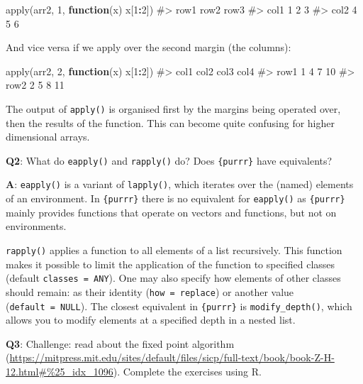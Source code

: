 \documentclass[
]{krantz}
\makeatletter
\newenvironment{Shaded}{\begin{snugshade}}{\end{snugshade}}
\newcommand{\CommentTok}[1]{\textcolor[rgb]{0.56,0.35,0.01}{\textit{#1}}}
\newcommand{\ControlFlowTok}[1]{\textcolor[rgb]{0.13,0.29,0.53}{\textbf{#1}}}
\newcommand{\DecValTok}[1]{\textcolor[rgb]{0.00,0.00,0.81}{#1}}
\newcommand{\KeywordTok}[1]{\textcolor[rgb]{0.13,0.29,0.53}{\textbf{#1}}}
\newcommand{\NormalTok}[1]{#1}
\newcommand{\OperatorTok}[1]{\textcolor[rgb]{0.81,0.36,0.00}{\textbf{#1}}}
\renewcommand{\href}[2]{#2 (\url{#1})}
\newenvironment{kframe}{%
\medskip{}
\setlength{\fboxsep}{.8em}
 \def\at@end@of@kframe{}%
 \ifinner\ifhmode%
  \def\at@end@of@kframe{\end{minipage}}%
  \begin{minipage}{\columnwidth}%
 \fi\fi%
 \def\FrameCommand##1{\hskip\@totalleftmargin \hskip-\fboxsep
 \colorbox{shadecolor}{##1}\hskip-\fboxsep
     \hskip-\linewidth \hskip-\@totalleftmargin \hskip\columnwidth}%
 \MakeFramed {\advance\hsize-\width
   \@totalleftmargin\z@ \linewidth\hsize
   \@setminipage}}%
 {\par\unskip\endMakeFramed%
 \at@end@of@kframe}
\renewenvironment{Shaded}{\begin{kframe}}{\end{kframe}}
\renewcommand{\KeywordTok} [1]{\textcolor[rgb]{0.00,0.44,0.13}{{#1}}}
\renewcommand{\DecValTok}  [1]{\textcolor[rgb]{0.25,0.63,0.44}{{#1}}}
\renewcommand{\CommentTok} [1]{\textcolor[rgb]{0.38,0.63,0.69}{{#1}}}
\renewcommand{\NormalTok}  [1]{{#1}}
\makeatother
\begin{document}
\begin{Shaded}
\begin{Highlighting}[]
\KeywordTok{apply}\NormalTok{(arr2, }\DecValTok{1}\NormalTok{, }\ControlFlowTok{function}\NormalTok{(x) x[}\DecValTok{1}\OperatorTok{:}\DecValTok{2}\NormalTok{])}
\CommentTok{#>      row1 row2 row3}
\CommentTok{#> col1    1    2    3}
\CommentTok{#> col2    4    5    6}
\end{Highlighting}
\end{Shaded}

And vice versa if we apply over the second margin (the columns):

\begin{Shaded}
\begin{Highlighting}[]
\KeywordTok{apply}\NormalTok{(arr2, }\DecValTok{2}\NormalTok{, }\ControlFlowTok{function}\NormalTok{(x) x[}\DecValTok{1}\OperatorTok{:}\DecValTok{2}\NormalTok{])}
\CommentTok{#>      col1 col2 col3 col4}
\CommentTok{#> row1    1    4    7   10}
\CommentTok{#> row2    2    5    8   11}
\end{Highlighting}
\end{Shaded}

The output of \texttt{apply()} is organised first by the margins being operated over, then the results of the function. This can become quite confusing for higher dimensional arrays.

\textbf{{Q2}}: What do \texttt{eapply()} and \texttt{rapply()} do? Does \texttt{\{purrr\}} have equivalents?

\textbf{{A}}: \texttt{eapply()} is a variant of \texttt{lapply()}, which iterates over the (named) elements of an environment. In \texttt{\{purrr\}} there is no equivalent for \texttt{eapply()} as \texttt{\{purrr\}} mainly provides functions that operate on vectors and functions, but not on environments.

\texttt{rapply()} applies a function to all elements of a list recursively. This function makes it possible to limit the application of the function to specified classes (default \texttt{classes\ =\ ANY}). One may also specify how elements of other classes should remain: as their identity (\texttt{how\ =\ replace}) or another value (\texttt{default\ =\ NULL}). The closest equivalent in \texttt{\{purrr\}} is \texttt{modify\_depth()}, which allows you to modify elements at a specified depth in a nested list.

\textbf{{Q3}}: Challenge: read about the \href{https://mitpress.mit.edu/sites/default/files/sicp/full-text/book/book-Z-H-12.html\#\%25_idx_1096}{fixed point algorithm}. Complete the exercises using R.
\end{document}
